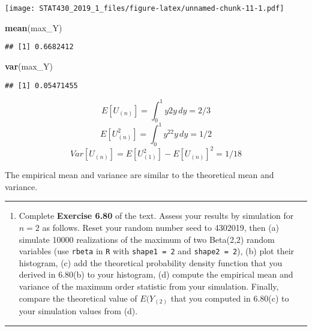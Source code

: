 \documentclass[]{article}
\newenvironment{Shaded}{\begin{snugshade}}{\end{snugshade}}
\newcommand{\KeywordTok}[1]{\textcolor[rgb]{0.13,0.29,0.53}{\textbf{#1}}}
\newcommand{\NormalTok}[1]{#1}
\providecommand{\tightlist}{%
  \setlength{\itemsep}{0pt}\setlength{\parskip}{0pt}}
\begin{document}
\texttt{[image: STAT430\_2019\_1\_files/figure-latex/unnamed-chunk-11-1.pdf]}

\begin{Shaded}
\begin{Highlighting}[]
\KeywordTok{mean}\NormalTok{(max_Y)}
\end{Highlighting}
\end{Shaded}

\begin{verbatim}
## [1] 0.6682412
\end{verbatim}

\begin{Shaded}
\begin{Highlighting}[]
\KeywordTok{var}\NormalTok{(max_Y)}
\end{Highlighting}
\end{Shaded}

\begin{verbatim}
## [1] 0.05471455
\end{verbatim}

\[
E[U_{(n)}] = \int_0^1 y2y\,dy = 2/3
\] \[
E[U_{(n)}^2] = \int_0^1 y^22y\,dy = 1/2
\] \[
Var[U_{(n)}] = E[U_{(1)}^2] - E[U_{(n)}]^2 = 1/18
\]

The empirical mean and variance are similar to the theoretical mean and
variance.

\begin{center}\rule{0.5\linewidth}{\linethickness}\end{center}

\begin{enumerate}
\def\labelenumi{\arabic{enumi}.}
\setcounter{enumi}{3}
\tightlist
\item
  Complete \textbf{Exercise 6.80} of the text. Assess your results by
  simulation for \(n=2\) as follows. Reset your random number seed to
  4302019, then (a) simulate 10000 realizations of the maximum of two
  Beta(2,2) random variables (use \texttt{rbeta} in \texttt{R} with
  \texttt{shape1\ =\ 2} and \texttt{shape2\ =\ 2}), (b) plot their
  histogram, (c) add the theoretical probability density function that
  you derived in 6.80(b) to your histogram, (d) compute the empirical
  mean and variance of the maximum order statistic from your simulation.
  Finally, compare the theoretical value of \(E(Y_{(2)}\) that you
  computed in 6.80(c) to your simulation values from (d).
\end{enumerate}

\begin{center}\rule{0.5\linewidth}{\linethickness}\end{center}
\end{document}
